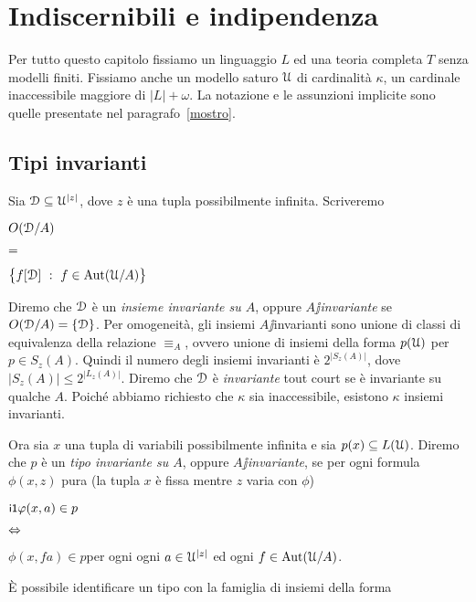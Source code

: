 \chapter{Indiscernibili e indipendenza}

\lavori

Per tutto questo capitolo fissiamo un linguaggio $L$ ed una teoria completa $T$ senza modelli finiti. Fissiamo anche un modello saturo $\EuScript U$ di cardinalit\`a $\kappa$, un cardinale inaccessibile maggiore di   $|L|+\omega$. La notazione e le assunzioni implicite sono quelle presentate nel paragrafo~\ref{mostro}.

\section{Tipi invarianti}\label{tipi_invarianti}

\def\ceq#1#2#3{\parbox[t]{15ex}{$\displaystyle #1$}\parbox[t]{5ex}{$\displaystyle\hfil #2$}{$\displaystyle #3$}}

Sia $\EuScript D\subseteq\EuScript U^{|z|}$, dove $z$ \`e una tupla possibilmente infinita. Scriveremo 

\ceq{\hfill O(\D/A)}{=}{\big\{f[\D]\ :\ f\in\Aut (\U/A)\big\}}

Diremo che $\EuScript D$ \`e un \emph{insieme invariante su $A$}, oppure \emph{$A\jj$invariante} se $O(\EuScript D/A)=\{\EuScript D\}$. Per omogeneit\`a, gli insiemi $A\jj$invarianti sono unione di classi di equivalenza della relazione $\equiv_A$, ovvero unione di insiemi della forma $p(\EuScript U)$ per $p\in S_z(A)$. Quindi il numero degli insiemi invarianti \`e $2^{|S_z(A)|}$, dove $|S_z(A)|\le 2^{|L_z(A)|}$.  Diremo che $\EuScript D$ \`e  \emph{invariante\/} tout court se \`e invariante su qualche $A$. Poich\'e abbiamo richiesto che $\kappa$ sia inaccessibile, esistono $\kappa$ insiemi invarianti.

Ora sia $x$ una tupla di variabili possibilmente infinita e sia $p(x)\subseteq L(\EuScript U)$. Diremo che $p$ \`e un \emph{tipo invariante su $A$}, oppure \emph{$A\jj$invariante}, se per ogni formula $\phi(x,z)$ pura (la tupla $x$ \`e fissa mentre $z$ varia con $\phi$)

\ceq{\ssf{i1}\hfill \phi(x,a)\in p}{\IFF}{\phi(x,fa)\in p}\hfill per ogni ogni $a\in\EuScript U^{|z|}$ ed ogni $f\in\textrm{Aut}(\EuScript U/A)$.

\`E possibile identificare un tipo con la famiglia di insiemi della forma

